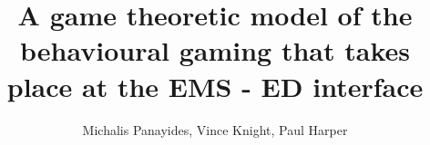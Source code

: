 \title{A game theoretic model of the behavioural gaming that takes place at the EMS - ED interface}
\author{Michalis Panayides, Vince Knight, Paul Harper}
\date{}
